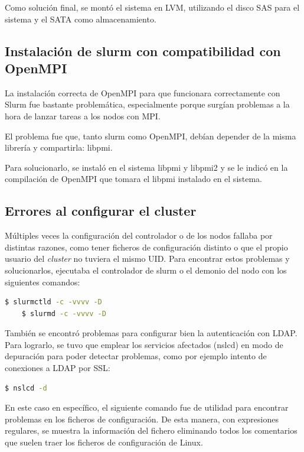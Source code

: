 Como solución final, se montó el sistema en LVM, utilizando el disco SAS para el sistema y el SATA como almacenamiento.

\subsection{Instalación de slurm con compatibilidad con OpenMPI}

La instalación correcta de OpenMPI para que funcionara correctamente con Slurm fue bastante problemática, especialmente porque surgían problemas a la hora de lanzar tareas a los nodos con MPI.
\vspace{2mm}

El problema fue que, tanto slurm como OpenMPI, debían depender de la misma librería y compartirla: libpmi. 
\vspace{2mm}

Para solucionarlo, se instaló en el sistema libpmi y libpmi2 y se le indicó en la compilación de OpenMPI que tomara el libpmi instalado en el sistema.

\subsection{Errores al configurar el cluster}

Múltiples veces la configuración del controlador o de los nodos fallaba por distintas razones, como tener ficheros de configuración distinto o que el propio usuario del \emph{cluster} no tuviera el mismo UID. Para encontrar estos problemas y solucionarlos, ejecutaba el controlador de slurm o el demonio del nodo con los siguientes comandos:
\vspace{2mm}
\begin{lstlisting}[language=bash]
    $ slurmctld -c -vvvv -D   
    $ slurmd -c -vvvv -D   
\end{lstlisting}
\vspace{2mm}

También se encontró problemas para configurar bien la autenticación con LDAP. Para lograrlo, se tuvo que emplear los servicios afectados (nslcd) en modo de depuración para poder detectar problemas, como por ejemplo intento de conexiones a LDAP por SSL:
\vspace{2mm}
\begin{lstlisting}[language=bash]
    $ nslcd -d
\end{lstlisting}
\vspace{2mm}

En este caso en específico, el siguiente comando fue de utilidad para encontrar problemas en los ficheros de configuración. De esta manera, con expresiones regulares, se muestra la información del fichero eliminando todos los comentarios que suelen traer los ficheros de configuración de Linux.


